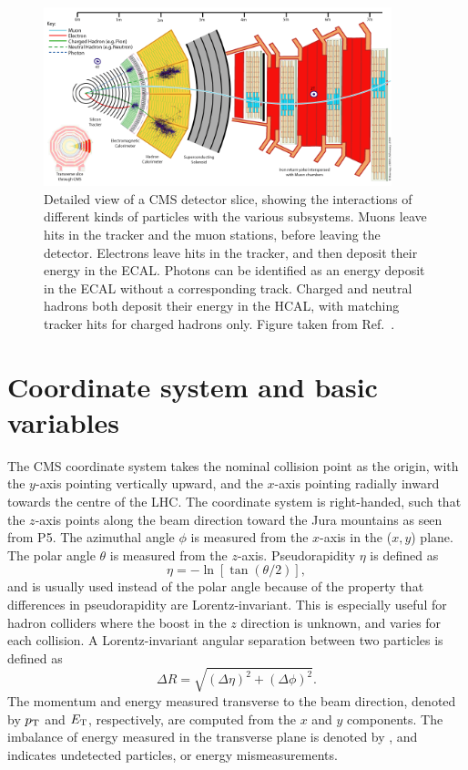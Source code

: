 \begin{figure}[htpb]
  \centering
  \includegraphics[width=0.9\textwidth]{figures/cms/CMS_Slice}
  \caption{Detailed view of a CMS detector slice, showing the interactions of different kinds of
particles with the various subsystems. Muons leave hits in the tracker and the muon stations,
before leaving the detector. Electrons leave hits in the tracker, and then deposit their
energy in the ECAL. Photons can be identified as an energy deposit in the ECAL without a
corresponding track. Charged and neutral hadrons both deposit their energy in the HCAL, with
matching tracker hits for charged hadrons only. 
Figure taken from Ref.~\cite{CMS_slice}.
  \label{fig:cms_slice}}
\end{figure}

\section{Coordinate system and basic variables \label{sec:cms_coordinates}}

The CMS coordinate system takes the nominal collision point as the origin, with the $y$-axis
pointing vertically upward, and the $x$-axis pointing radially inward towards the centre of the
LHC. The coordinate system is right-handed, such that the $z$-axis points along the beam direction
toward the Jura mountains as seen from P5. 
The azimuthal angle $\phi$ is measured from the $x$-axis in the ($x,y$) plane. The polar angle
$\theta$ is measured from the $z$-axis. 
Pseudorapidity $\eta$ is defined as 
\begin{equation}
 \eta = - \ln \left[ \tan(\theta/2) \right],  
\end{equation}
and is usually used instead of the
polar angle because of the property that differences in pseudorapidity are
Lorentz-invariant. This is especially useful for hadron colliders where the boost in the $z$
direction is unknown, and varies for each collision. A Lorentz-invariant angular separation between
two particles is defined as 
\begin{equation}
\Delta R = \sqrt{(\Delta\eta)^2 + (\Delta\phi)^2}.
\end{equation}
The momentum and energy measured transverse to the beam direction, denoted by $p_{\mathrm{T}}$ and $E_{\mathrm{T}}$,
respectively, are computed from the $x$ and $y$ components.
The imbalance of energy measured in the transverse plane is denoted by \ETm, and indicates
undetected particles, or energy mismeasurements.
 

